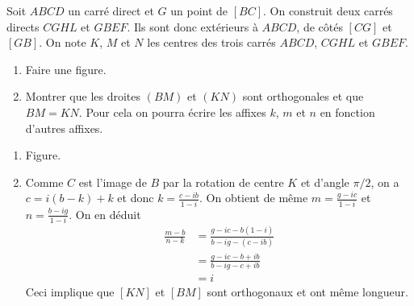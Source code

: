 \begin{exo}
Soit $ABCD$ un carré direct et $G$ un point de $[BC]$. On construit deux carrés directs $CGHL$ et $GBEF$. Ils sont donc extérieurs à $ABCD$, de côtés $[CG]$ et $[GB]$.
On note $K$, $M$ et $N$ les centres des trois carrés $ABCD$, $CGHL$ et $GBEF$.
\begin{enumerate}
\item Faire une figure.
\item Montrer que les droites $(BM)$ et $(KN)$ sont orthogonales et que $BM = KN$. Pour cela on pourra écrire les affixes $k$, $m$ et $n$ en fonction d'autres affixes.
\end{enumerate}
\begin{sol}
\begin{enumerate}
\item Figure.
\item Comme $C$ est l'image de $B$ par la rotation de centre $K$ et d'angle $\pi/2$, on a $c=i(b-k)+k$ et donc $k=\frac{c-ib}{1-i}$. On obtient de même $m=\frac{g-ic}{1-i}$ et $n=\frac{b-ig}{1-i}$. On en déduit
\begin{align*}
\frac{m-b}{n-k}
&=
\frac{g-ic-b(1-i)}{b-ig-(c-ib)}\\
&=\frac{g-ic-b+ib}{b-ig-c+ib}\\
&=\boxed{i}
\end{align*}
Ceci implique que $[KN]$ et $[BM]$ sont orthogonaux et ont même longueur.
\end{enumerate}
\end{sol}
\end{exo}







